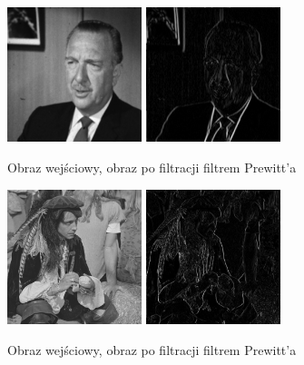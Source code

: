 \documentclass[final,a4paper,openany,12pt]{mwbk}
\begin{document}
\begin{figure}[H]
	\begin{center}
		\includegraphics[width=0.35\textwidth]{gentelman_gray}
		\includegraphics[width=0.35\textwidth]{gentelman_gray_highpassPrewitt_result}
	\end{center}
	\caption{Obraz wejściowy, obraz po filtracji filtrem Prewitt'a}
\end{figure}

\begin{figure}[H]
	\begin{center}
		\includegraphics[width=0.35\textwidth]{pirate_gray}
		\includegraphics[width=0.35\textwidth]{pirate_gray_highpassPrewitt_result}
	\end{center}
	\caption{Obraz wejściowy, obraz po filtracji filtrem Prewitt'a}
\end{figure}
\end{document}
